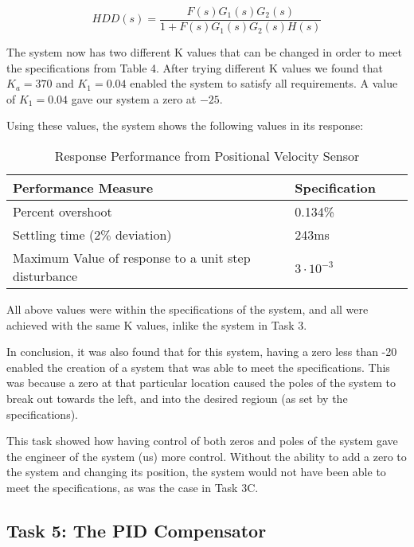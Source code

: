 \documentclass{article}
\begin{document}
$$HDD(s) = \frac{F(s)G_1(s)G_2(s)}{1 + F(s)G_1(s)G_2(s)H(s)}$$

The system now has two different K values that can be changed in order to meet
the specifications from Table 4. After trying different K values we found that
$K_a = 370$ and $K_1 = 0.04$ enabled the system to satisfy all requirements.
A value of $K_1 = 0.04$ gave our system a zero at $-25$.

Using these values, the system shows the following values in its response:

\begin{table}[H]
\begin{center}
  \begin{tabular}{ | l | l | l | p{5cm} |}
  \hline
  \textbf{Performance Measure} & \textbf{Specification}\\ \hline 
  Percent overshoot & 0.134\% \\ \hline 
  Settling time ($2\%$ deviation) & 243ms \\ \hline 
  Maximum Value of response to a unit step disturbance & $3\cdot10^{-3}$\\ \hline 
 \end{tabular}
\end{center}
\caption{Response Performance from Positional Velocity Sensor}
\end{table}

All above values were within the specifications of the system, and all were
achieved with the same K values, inlike the system in Task 3.


In conclusion, it was also found that for this system, having a zero less than
-20 enabled the creation of a system that was able to meet the specifications.
This was because a zero at that particular location caused the poles of the
system to break out towards the left, and into the desired regioun (as set by
the specifications).

This task showed how having control of both zeros and poles of the system gave
the engineer of the system (us) more control. Without the ability to add a
zero to the system and changing its position, the system would not have been
able to meet the specifications, as was the case in Task 3C.

\subsection*{Task 5: The PID Compensator}
\end{document}
